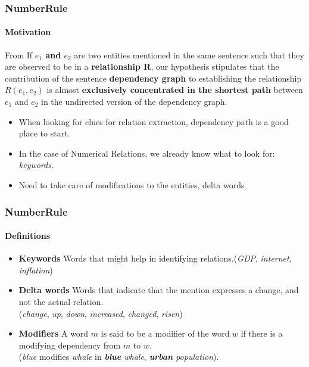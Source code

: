 \documentclass{beamer}
\newcommand{\ntronitemsep}{1em}
\begin{document}

\begin{frame}
\frametitle{NumberRule}
\framesubtitle{Motivation}

\begin{block}{From \cite{shortestpathdep}}
If \textbf{$e_1$ and $e_2$ }are two entities mentioned in the same
 sentence such that they are observed to be in a \textbf{relationship R}, our hypothesis stipulates that the contribution of the sentence \textbf{dependency graph} to establishing the relationship $R(e_1, e_2)$ is almost \textbf{exclusively concentrated in the shortest path} between $e_1$ and $e_2$ in the undirected version of the dependency graph.
\end{block}
\begin{itemize}
\item When looking for clues for relation extraction, dependency path is a good place to start.
\item In the case of Numerical Relations, we already know what to look for: \textit{keywords}.
\item Need to take care of modifications to the entities, delta words
\end{itemize}
\end{frame}


\begin{frame}
\frametitle{NumberRule}
\framesubtitle{Definitions}
\begin{itemize}
\setlength\itemsep{\ntronitemsep}
 \item \textbf{Keywords}  Words that might help in identifying relations.(\textit{GDP}, \textit{internet}, \textit{inflation})
 \item \textbf{Delta words} Words that indicate that the mention expresses a change, and not the actual relation. \\ (\textit{change}, \textit{up}, \textit{down}, \textit{increased}, \textit{changed}, \textit{risen})
  \item \textbf{Modifiers} A word $m$ is said to be a modifier of the word $w$ if there is a modifying dependency from $m$ to $w$.\\ (\textit{blue} modifies \textit{whale} in \emph{\textbf{blue} whale}, \emph{\textbf{urban} population}).
\end{itemize}

\end{frame}
\end{document}
